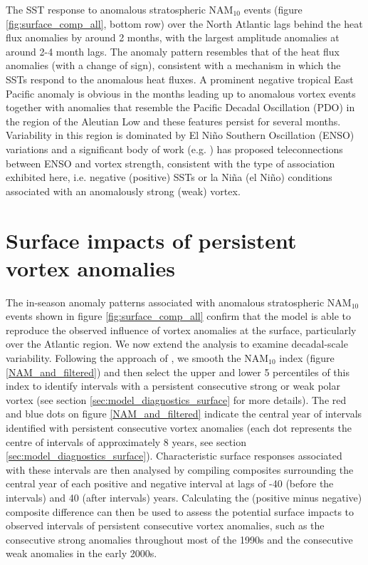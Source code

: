 The SST response to anomalous stratospheric NAM$_{10}$ events (figure \ref{fig:surface_comp_all}, bottom row) over the North Atlantic lags behind the heat flux anomalies by around 2 months, with the largest amplitude anomalies at around 2-4 month lags. The anomaly pattern resembles that of the heat flux anomalies (with a change of sign), consistent with a mechanism in which the SSTs respond to the anomalous heat fluxes. A prominent negative tropical East Pacific anomaly is obvious in the months leading up to anomalous vortex events together with  anomalies that resemble the Pacific Decadal Oscillation (PDO) in the region of the Aleutian Low \citep{mantuaPacific1997a} and these features persist for several months. Variability in this region is dominated by El Ni\~{n}o Southern Oscillation (ENSO) variations and a significant body of work (e.g. \cite{domeisenTeleconnection2019d}) has proposed teleconnections between ENSO and vortex strength, consistent with the type of association exhibited here, i.e. negative (positive) SSTs or la Ni\~{n}a (el Ni\~{n}o) conditions associated with an anomalously strong (weak) vortex. 


\section{Surface impacts of persistent vortex anomalies}
\label{persistent}
The in-season anomaly patterns associated with anomalous stratospheric NAM$_{10}$ events shown in figure \ref{fig:surface_comp_all} confirm that the model is able to reproduce the observed influence of vortex anomalies at the surface, particularly over the Atlantic region. We now extend the analysis to examine decadal-scale variability. Following the approach of \cite{reichlerStratospheric2012b}, we smooth the NAM$_{10}$ index  (figure \ref{NAM_and_filtered}) and then select the upper and lower 5 percentiles of this index to identify intervals with a persistent consecutive strong or weak polar vortex (see section \ref{sec:model_diagnostics_surface} for more details). The red and blue dots on figure \ref{NAM_and_filtered} indicate the central year of intervals identified with persistent consecutive vortex anomalies (each dot represents the centre of intervals of approximately 8 years, see section \ref{sec:model_diagnostics_surface}). Characteristic surface responses associated with these intervals are then analysed by compiling composites surrounding the central year of each positive and negative interval at lags of -40 (before the intervals) and 40 (after intervals) years. Calculating the (positive minus negative) composite difference can then be used to assess the potential surface impacts to observed intervals of persistent consecutive vortex anomalies, such as the consecutive strong anomalies throughout most of the 1990s and the consecutive weak anomalies in the early 2000s. 
 
